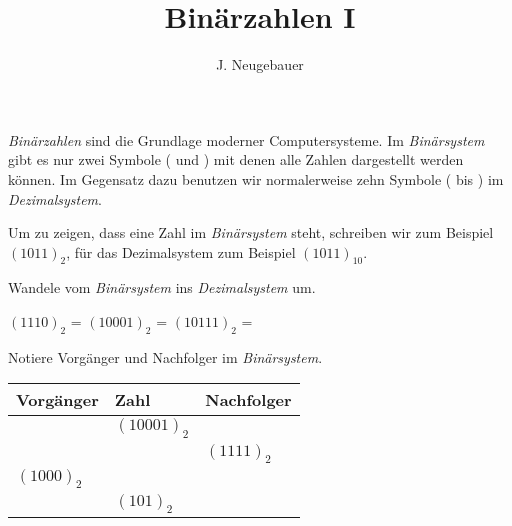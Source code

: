 \documentclass[10pt, a5paper]{scrartcl}
\author{J. Neugebauer}
\title{Binärzahlen I}
\date{\Heute}
\begin{document}
\ReiheTitel

\emph{Binärzahlen} sind die Grundlage moderner Computersysteme. Im \emph{Binärsystem} gibt es nur zwei Symbole ( und ) mit denen alle Zahlen dargestellt werden können. Im Gegensatz dazu benutzen wir normalerweise zehn Symbole ( bis ) im \emph{Dezimalsystem}.

Um zu zeigen, dass eine Zahl im \emph{Binärsystem} steht, schreiben wir zum Beispiel $(1011)_2$, für das Dezimalsystem zum Beispiel $(1011)_{10}$.

\begin{aufgabe}[subtitle=Binärzahlen umrechnen]
	Wandele vom \emph{Binärsystem} ins \emph{Dezimalsystem} um.
	
	\begin{teilaufgaben}
		\teilaufgabe $(1110)_2$ =
		\teilaufgabe $(10001)_2$ = 
		\teilaufgabe $(10111)_2$ = 
	\end{teilaufgaben}
\end{aufgabe}

\begin{aufgabe}[subtitle=Vorgänger und Nachfolger]
	Notiere Vorgänger und Nachfolger im \emph{Binärsystem}.
	
	\begin{tabularx}{\textwidth}{|X|X|X|}\hline
		\rowcolor{ngb.tabelle.kopf.hg} Vorgänger & Zahl & Nachfolger \\\hline
		\Zeilenabstand & $(10001)_2$ & \\\hline
		\Zeilenabstand & & $(1111)_2$ \\\hline
		$(1000)_2$ &\Zeilenabstand & \\\hline
		\Zeilenabstand & $(101)_2$ & \\\hline
	\end{tabularx}
\end{aufgabe}
\end{document}
